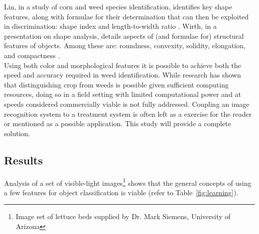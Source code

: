 \documentclass[12pt]{article}
\begin{document}
Lin, in a study of corn and weed species identification, identifies key shape features, along with formulae for their determination that can then be exploited in discrimination: shape index and length-to-width ratio \parencite{Lin2017-xq}. Wirth, in a presentation on shape analysis, details aspects of (and formulae for) structural features of objects. Among these are: roundness, convexity, solidity, elongation, and compactness \parencite{Wirth2004-li}.\\
Using both color and morphological features it is possible to achieve both the speed and accuracy required in weed identification. While research has shown that distinguishing crop from weeds is possible given sufficient computing resources, doing so in a field setting with limited computational power and at speeds considered commercially viable is not fully addressed. Coupling an image recognition system to a treatment system is often left as a exercise for the reader or mentioned as a possible application. This study will provide a complete solution.


\subsection{Results}
Analysis of a set of visible-light images\footnote{Image set of lettuce beds supplied by Dr. Mark Siemens, University of Arizona} shows that the general concepts of using a few features for object classification is viable (refer to Table~\ref{fig:learning}).
\end{document}
